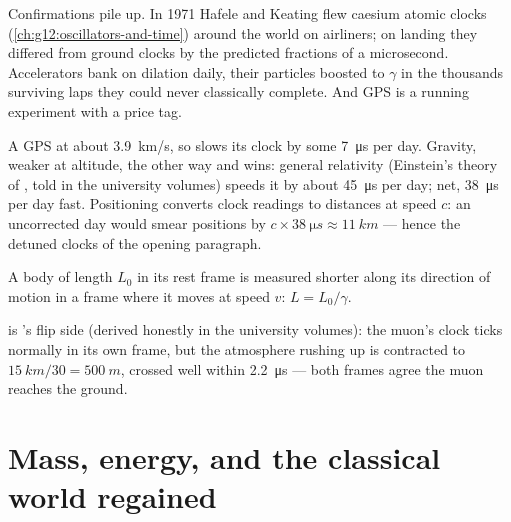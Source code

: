 Confirmations pile up. In 1971 Hafele and Keating flew caesium atomic
clocks (\cref{ch:g12:oscillators-and-time}) around the world on airliners;
on landing they differed from ground clocks by the predicted fractions of
a microsecond. Accelerators bank on dilation daily, their particles
boosted to $\gamma$ in the thousands surviving laps they could never
classically complete. And GPS is a running experiment with a price tag.

\begin{remark}\label{rem:g12:special-relativity:gps}
A GPS   at about \qty{3.9}{km/s}, so 
slows its clock by some \qty{7}{\micro s} per day. Gravity, weaker at
altitude,  the other way and wins: general relativity (Einstein's
theory of , told in the university volumes) speeds it by about
\qty{45}{\micro s} per day; net, \qty{38}{\micro s} per day fast.
Positioning converts clock readings to
distances at speed $c$: an uncorrected day would smear positions by
$c \times \qty{38}{\micro s} \approx \qty{11}{km}$ --- hence the detuned
clocks of the opening paragraph.
\end{remark}

\begin{proposition}\label{prop:g12:special-relativity:contraction}
A body of length $L_0$ in its rest frame is measured shorter along its
direction of motion in a frame where it moves at speed $v$:
$L = L_0/\gamma$.
\end{proposition}
\admitted

\begin{remark}\label{rem:g12:special-relativity:muonframe}
 is 's flip side (derived honestly in the
university volumes): the muon's clock ticks normally in its own frame, but
the atmosphere rushing up is contracted to $\qty{15}{km}/30 =
\qty{500}{m}$, crossed well within \qty{2.2}{\micro s} --- both frames
agree the muon reaches the ground.
\end{remark}

\section{Mass, energy, and the classical world regained}

